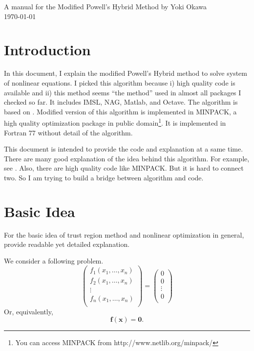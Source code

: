 \documentclass[12pt]{article}
\def\xb{{\mathbf{x}}}
\def\fb{{\mathbf{f}}}
\def\0{{\mathbf{0}}}
\newcommand{\be}{\begin{equation}}
\newcommand{\ee}{\end{equation}}
\begin{document}
\begin{center}
 {\Large A manual for the Modified Powell's Hybrid Method} {\large by Yoki Okawa }\\[0.5cm]
 {\large \today}\\[0.5cm]
\end{center}

\section{Introduction}


In this document, I explain the modified Powell's Hybrid method to solve system of nonlinear
equations. I picked this algorithm because i) high quality code is available and ii) this method
seems ``the method'' used in almost all packages I checked so far. It includes IMSL, NAG, Matlab,
and Octave. The algorithm is based on \cite{Powell1970, Powell1970a}. Modified version of this
algorithm is implemented in MINPACK, a high quality optimization package in public
domain\footnote{You can access MINPACK from http://www.netlib.org/minpack/ }. It is implemented in
Fortran 77 without detail of the algorithm. 

This document is intended to provide the code and explanation at a same time. There are many good
explanation of the idea behind this algorithm. For example, see \cite{NocedalWright2000}. Also,
there are high quality code like MINPACK. But it is hard to connect two. So I am trying to build a
bridge between algorithm and code. 

\section{Basic Idea}
For the basic idea of trust region method and nonlinear optimization in general,
\cite{NocedalWright2000} provide readable yet detailed explanation. 

We consider a following problem.
\[
\begin{pmatrix}
f_1(x_1,\dots,x_n)\\
f_2(x_1,\dots,x_n) \\
\vdots\\
f_n(x_1,\dots,x_n) \\
\end{pmatrix}
= 
\begin{pmatrix}
0\\
0 \\
\vdots\\
0\\
\end{pmatrix}
\]
Or, equivalently,
\be \label{eq:prob}
\fb (\xb) = \0.
\ee
\end{document}
